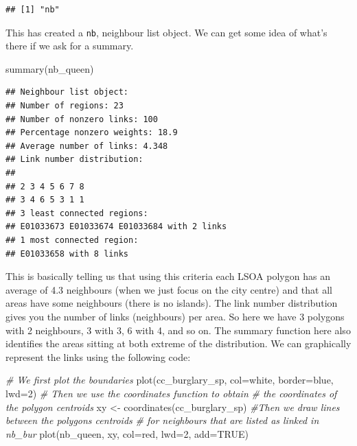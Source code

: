 \documentclass[
  krantz2]{krantz}
\makeatletter
\newenvironment{Shaded}{\begin{snugshade}}{\end{snugshade}}
\newcommand{\AttributeTok}[1]{\textcolor[rgb]{0.61,0.61,0.61}{#1}}
\newcommand{\CommentTok}[1]{\textcolor[rgb]{0.37,0.37,0.37}{\textit{#1}}}
\newcommand{\ConstantTok}[1]{\textcolor[rgb]{0,0,0}{#1}}
\newcommand{\DecValTok}[1]{\textcolor[rgb]{0.06,0.06,0.06}{#1}}
\newcommand{\FunctionTok}[1]{\textcolor[rgb]{0,0,0}{#1}}
\newcommand{\NormalTok}[1]{#1}
\newcommand{\OtherTok}[1]{\textcolor[rgb]{0.37,0.37,0.37}{#1}}
\newcommand{\StringTok}[1]{\textcolor[rgb]{0.5,0.5,0.5}{#1}}
\newenvironment{kframe}{%
\medskip{}
\setlength{\fboxsep}{.8em}
 \def\at@end@of@kframe{}%
 \ifinner\ifhmode%
  \def\at@end@of@kframe{\end{minipage}}%
  \begin{minipage}{\columnwidth}%
 \fi\fi%
 \def\FrameCommand##1{\hskip\@totalleftmargin \hskip-\fboxsep
 \colorbox{shadecolor}{##1}\hskip-\fboxsep
     \hskip-\linewidth \hskip-\@totalleftmargin \hskip\columnwidth}%
 \MakeFramed {\advance\hsize-\width
   \@totalleftmargin\z@ \linewidth\hsize
   \@setminipage}}%
 {\par\unskip\endMakeFramed%
 \at@end@of@kframe}
\renewenvironment{Shaded}{\begin{kframe}}{\end{kframe}}
\makeatother
\begin{document}
\begin{verbatim}
## [1] "nb"
\end{verbatim}

This has created a \texttt{nb}, neighbour list object. We can get some idea of what's there if we ask for a summary.

\begin{Shaded}
\begin{Highlighting}[]
\FunctionTok{summary}\NormalTok{(nb\_queen)}
\end{Highlighting}
\end{Shaded}

\begin{verbatim}
## Neighbour list object:
## Number of regions: 23 
## Number of nonzero links: 100 
## Percentage nonzero weights: 18.9 
## Average number of links: 4.348 
## Link number distribution:
## 
## 2 3 4 5 6 7 8 
## 3 4 6 5 3 1 1 
## 3 least connected regions:
## E01033673 E01033674 E01033684 with 2 links
## 1 most connected region:
## E01033658 with 8 links
\end{verbatim}

This is basically telling us that using this criteria each LSOA polygon has an average of 4.3 neighbours (when we just focus on the city centre) and that all areas have some neighbours (there is no islands). The link number distribution gives you the number of links (neighbours) per area. So here we have 3 polygons with 2 neighbours, 3 with 3, 6 with 4, and so on. The summary function here also identifies the areas sitting at both extreme of the distribution. We can graphically represent the links using the following code:

\begin{Shaded}
\begin{Highlighting}[]
\CommentTok{\# We first plot the boundaries}
\FunctionTok{plot}\NormalTok{(cc\_burglary\_sp, }\AttributeTok{col=}\StringTok{\textquotesingle{}white\textquotesingle{}}\NormalTok{, }\AttributeTok{border=}\StringTok{\textquotesingle{}blue\textquotesingle{}}\NormalTok{, }\AttributeTok{lwd=}\DecValTok{2}\NormalTok{)}
\CommentTok{\# Then we use the coordinates function to obtain }
\CommentTok{\# the coordinates of the polygon centroids}
\NormalTok{xy }\OtherTok{\textless{}{-}} \FunctionTok{coordinates}\NormalTok{(cc\_burglary\_sp)}
\CommentTok{\#Then we draw lines between the polygons centroids }
\CommentTok{\# for neighbours that are listed as linked in nb\_bur}
\FunctionTok{plot}\NormalTok{(nb\_queen, xy, }\AttributeTok{col=}\StringTok{\textquotesingle{}red\textquotesingle{}}\NormalTok{, }\AttributeTok{lwd=}\DecValTok{2}\NormalTok{, }\AttributeTok{add=}\ConstantTok{TRUE}\NormalTok{)}
\end{Highlighting}
\end{Shaded}
\end{document}

